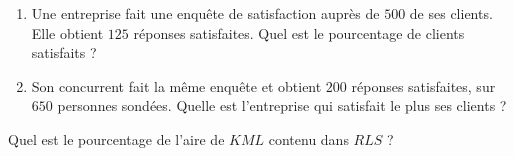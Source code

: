 
\begin{rituel}
    
\begin{enumerate}
    \item
        Une entreprise fait une enquête de satisfaction auprès de \( 500\) de ses clients. Elle obtient \( 125\) réponses satisfaites. Quel est le pourcentage de clients satisfaits ?
    \item
        Son concurrent fait la même enquête et obtient \( 200\) réponses satisfaites, sur \( 650\) personnes sondées. Quelle est l'entreprise qui satisfait le plus ses clients ?
\end{enumerate}

\end{rituel}


\begin{ritue}
    
\begin{center}
    
\end{center}

Quel est le pourcentage de l'aire de \( KML\) contenu dans \( RLS\) ?

\end{ritue}




